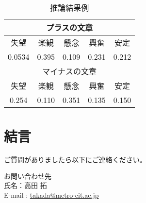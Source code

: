 \documentclass[a4paper,11pt]{article}
\begin{document}
\begin{table}[htbp]
    \centering
    \begin{tabular}{|c|c|c|c|c|}\hline
        \multicolumn{5}{|c|}{プラスの文章} \\ \hline
        失望 & 楽観 & 懸念 & 興奮 & 安定 \\ \hline
        0.0534 & 0.395 & 0.109 & 0.231 & 0.212 \\ \hline
        \multicolumn{5}{|c|}{マイナスの文章} \\ \hline
        失望 & 楽観 & 懸念 & 興奮 & 安定 \\ \hline
        0.254 & 0.110 & 0.351 & 0.135 & 0.150 \\ \hline
    \end{tabular}

    \caption{推論結果例}

\end{table}





\section{結言}
ご質問がありましたら以下にご連絡ください。

\noindent
{}
お問い合わせ先\\
氏名：高田 拓 \\
E-mail : \href{mailto:takada@metro-cit.ac.jp}{takada@metro-cit.ac.jp}
\end{document}
